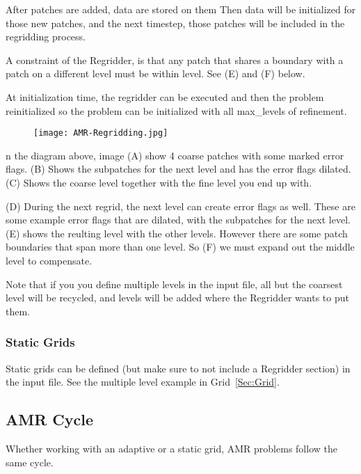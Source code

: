 After patches are added, data are stored on them Then data will be
initialized for those new patches, and the next timestep, those
patches will be included in the regridding process.

A constraint of the Regridder, is that any patch that shares a
boundary with a patch on a different level must be within level. See
(E) and (F) below.

At initialization time, the regridder can be executed and then the
problem reinitialized so the problem can be initialized with all
max\_levels of refinement.

\begin{figure}[h]
  \centering
  \texttt{[image: AMR-Regridding.jpg]}
  \caption{}
  \label{}
\end{figure}

n the diagram above, image (A) show 4 coarse patches with some marked
error flags. (B) Shows the subpatches for the next level and has the
error flags dilated. (C) Shows the coarse level together with the fine
level you end up with.

(D) During the next regrid, the next level can create error flags as
well. These are some example error flags that are dilated, with the
subpatches for the next level. (E) shows the reulting level with the
other levels. However there are some patch boundaries that span more
than one level. So (F) we must expand out the middle level to
compensate.

Note that if you you define multiple levels in the input file, all but
the coarsest level will be recycled, and levels will be added where
the Regridder wants to put them.

\subsubsection{Static Grids}

Static grids can be defined (but make sure to not include a Regridder
section) in the input file. See the multiple level example in
Grid~\ref{Sec:Grid}.

\subsection{AMR Cycle}

Whether working with an adaptive or a static grid, AMR problems follow
the same cycle. 

